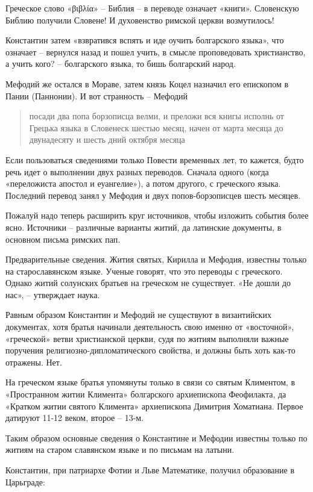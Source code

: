Греческое слово «βιβλία» – Библия – в переводе означает «книги». Словенскую Библию получили Словене! И духовенство римской церкви возмутилось!
 
Константин затем «взвратився вспять и иде оучить болгарского языка», что означает  – вернулся назад и пошел учить, в смысле проповедовать христианство, а учить кого? – болгарского языка, то бишь болгарский народ.

Мефодий же остался в Мораве, затем князь Коцел назначил его епископом в Пании (Паннонии). И вот странность – Мефодий

\begin{quotation}
посади два попа борзописца велми, и преложи вся книгы исполнь от Грецька языка в Словенеск шестью месяц, начен от марта месяца до двунадесяту и шесть дний октября месяца
\end{quotation}

Если пользоваться сведениями только Повести временных лет, то кажется, будто речь идет о выполнении двух разных переводов. Сначала одного (когда «переложиста апостол и еуангелие»), а потом другого, с греческого языка. Последний перевод занял у Мефодия и двух попов-борзописцев шесть месяцев.

Пожалуй надо теперь расширить круг источников, чтобы изложить события более ясно. Источники – различные варианты житий, да латинские документы, в основном письма римских пап.

Предварительные сведения. Жития святых, Кирилла и Мефодия, известны только на старославянском  языке. Ученые говорят, что это переводы с греческого. Однако житий солунских братьев на греческом не существует. «Не дошли до нас», – утверждает наука.

Равным образом Константин и Мефодий не существуют в византийских документах, хотя братья начинали деятельность свою именно от «восточной», «греческой» ветви христианской церкви, судя по житиям выполняли важные поручения религиозно-дипломатического свойства, и должны быть хоть как-то отражены. Нет.

На греческом языке братья упомянуты только в связи со святым Климентом, в «Пространном житии Климента» болгарского архиепископа Феофилакта, да «Кратком житии святого Климента» архиепископа Димитрия Хоматиана. Первое датируют 11-12 веком, второе – 13-м.

Таким образом основные сведения о Константине и Мефодии известны только по житиям на старом славянском языке и по письмам на латыни.

Константин, при патриархе Фотии и Льве Математике, получил образование в Царьграде:


